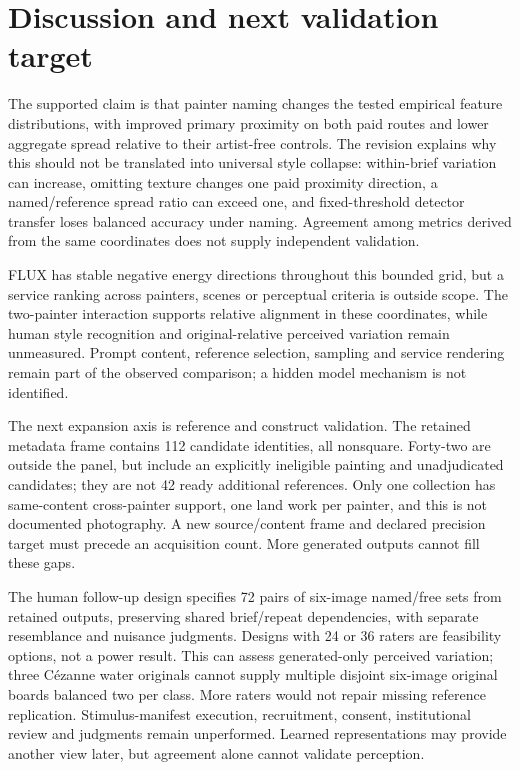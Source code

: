 \section{Discussion and next validation target}
The supported claim is that painter naming changes the tested empirical feature
distributions, with improved primary proximity on both paid routes and lower
aggregate spread relative to their artist-free controls. The revision explains
why this should not be translated into universal style collapse: within-brief
variation can increase, omitting texture changes one paid proximity direction,
a named/reference spread ratio can exceed one, and fixed-threshold detector
transfer loses balanced accuracy under naming. Agreement among metrics derived from the same coordinates
does not supply independent validation.

FLUX has stable negative energy directions throughout this bounded grid, but a
service ranking across painters, scenes or perceptual criteria is outside scope.
The two-painter interaction supports relative alignment in these coordinates,
while human style recognition and original-relative perceived variation remain
unmeasured. Prompt content, reference selection, sampling and service rendering
remain part of the observed comparison; a hidden model mechanism is not identified.

The next expansion axis is reference and construct validation. The retained
metadata frame contains 112 candidate identities, all nonsquare. Forty-two are
outside the panel, but include an explicitly ineligible painting and unadjudicated
candidates; they are not 42 ready additional references. Only one collection has
same-content cross-painter support, one land work per painter, and this is not
documented photography. A new source/content frame and declared precision target
must precede an acquisition count. More generated outputs cannot fill these gaps.

The human follow-up design specifies 72 pairs of six-image named/free sets from
retained outputs, preserving shared brief/repeat dependencies, with separate
resemblance and nuisance judgments. Designs with 24 or 36 raters are feasibility
options, not a power result. This can assess generated-only perceived variation;
three C\'ezanne water originals cannot supply multiple disjoint six-image original
boards balanced two per class. More raters would not repair missing reference
replication. Stimulus-manifest execution, recruitment, consent, institutional
review and judgments remain unperformed. Learned representations may provide
another view later, but agreement alone cannot validate perception.
